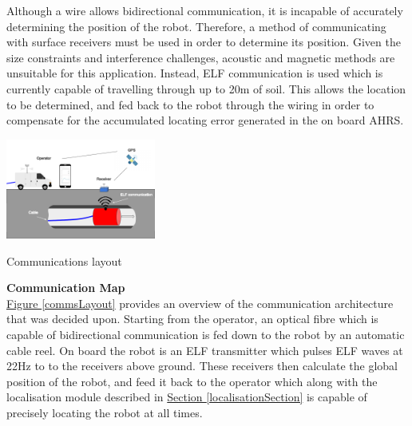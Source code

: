 \documentclass[11pt]{article}		%
\newcommand{\figref}[1]{\hyperref[#1]{Figure \ref*{#1}}}    %
\newcommand{\sectref}[1]{\hyperref[#1]{Section \ref*{#1}}}     %
\begin{document}
	        \hspace*{3ex}Although a wire allows bidirectional communication, it is incapable of accurately determining the position of the robot. 
	        Therefore, a method of communicating with surface receivers must be used in order to determine its position. 
	        Given the size constraints and interference challenges, acoustic and magnetic methods are unsuitable for this application. 
	        Instead, ELF communication is used which is currently capable of travelling through up to 20m of soil. 
	        This allows the location to be determined, and fed back to the robot through the wiring in order to compensate for the accumulated locating error generated in the on board AHRS.
	        \begin{floatingfigure}[r]{0.4\textwidth}
				\centering
				\includegraphics[width=0.37\textwidth]{comms layout}
				\caption{Communications layout}
				\label{commsLayout}
			\end{floatingfigure}
    
	        \textbf{Communication Map}
	        \\
	        \figref{commsLayout} provides an overview of the communication architecture that was decided upon. 
	        Starting from the operator, an optical fibre which is capable of bidirectional communication is fed down to the robot by an automatic cable reel. 
	        On board the robot is an ELF transmitter which pulses ELF waves at 22Hz to to the receivers above ground. 
	        These receivers then calculate the global position of the robot, and feed it back to the operator which along with the localisation module described in \sectref{localisationSection} is capable of precisely locating the robot at all times.
			\begin{floatingfigure}[r]{0pt} \end{floatingfigure}
			
\end{document}
